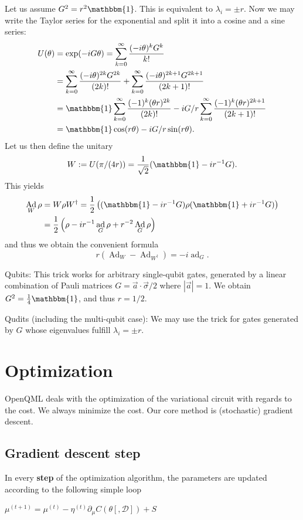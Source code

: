 \documentclass[aps,pra,10pt,twocolumn,groupedaddress,nofootinbib]{revtex4-1}
\theoremstyle{plain}
\DeclareMathOperator{\Ad}{Ad}
\DeclareMathOperator{\ad}{ad}
\newcommand{\be}{\begin{equation}}
\newcommand{\ee}{\end{equation}}
\newcommand{\I}{\mathbbm{1}} %
\begin{document}
Let us assume $G^2 = r^2\I$.
This is equivalent to $\lambda_i = \pm r$.
Now we may write the Taylor series for the exponential
and split it into a cosine and a sine series:
\begin{align*}
U(\theta) &= \exp(-iG\theta) = \sum_{k=0}^\infty \frac{(-i\theta)^k G^k}{k!}\\
&=
\sum_{k=0}^\infty \frac{(-i\theta)^{2k} G^{2k}}{(2k)!}
+\sum_{k=0}^\infty \frac{(-i\theta)^{2k+1} G^{2k+1}}{(2k+1)!}\\
&=
\I \sum_{k=0}^\infty \frac{(-1)^{k} (\theta r)^{2k}}{(2k)!}
-i G/r \sum_{k=0}^\infty \frac{(-1)^{k} (\theta r)^{2k+1}}{(2k+1)!}\\
&=
\I \cos(r \theta)
-i G/r \sin(r \theta).
\end{align*}
Let us then define the unitary
\be
W := U(\pi/(4r)) = \frac{1}{\sqrt{2}}(\I -ir^{-1}G).
\ee
This yields
\begin{align}
  \notag
\Ad_W \rho
&= W \rho W^\dagger
= \frac{1}{2}\left((\I-ir^{-1}G)\rho(\I+ir^{-1}G)\right)\\
&= \frac{1}{2}\left(\rho -ir^{-1}\ad_G \rho +r^{-2}\Ad_G \rho\right)
\end{align}
and thus we obtain the convenient formula
\be
r(\Ad_W-\Ad_{W^\dagger}) = -i\ad_G.
\ee


Qubits:
This trick works for arbitrary single-qubit gates, generated by a linear combination of Pauli matrices
$G = \vec{a} \cdot \vec{\sigma}/2$
where $|\vec{a}|=1$.
We obtain $G^2 = \frac{1}{4} \I$, and thus $r=1/2$.

Qudits (including the multi-qubit case):
We may use the trick for gates generated by $G$ whose
eigenvalues fulfill $\lambda_i = \pm r$.

\section{Optimization}

OpenQML deals with the optimization of the variational circuit with
regards to the cost. We always minimize the cost. Our core method is
(stochastic) gradient descent.

\subsection{Gradient descent step}
In every \textbf{step} of the optimization algorithm, the parameters are updated according to the following simple loop\\

\begin{algorithmic}[1]
\For {$\mu \in \theta $}
\State $\mu^{(t+1)} = \mu^{(t)} - \eta^{(t)} \partial_{\mu} C(\theta[, \mathcal{D}]) + S$
\EndFor
\EndProcedure
\end{algorithmic}
\end{document}
